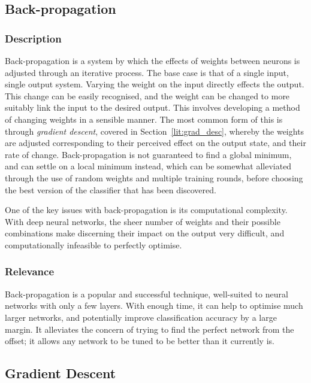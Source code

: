 \subsection{Back-propagation}
\subsubsection{Description}
Back-propagation is a system by which the effects of weights between neurons is adjusted through an iterative process. The base case is that of a single input, single output system. 
Varying the weight on the input directly effects the output. This change can be easily recognised, and the weight can be changed to more suitably link the input to the desired output. This involves developing a method of changing weights in a sensible manner. The most common form of this is through \textit{gradient descent}, covered in Section~\ref{lit:grad_desc}, whereby the weights are adjusted corresponding to their perceived effect on the output state, and their rate of change. Back-propagation is not guaranteed to find a global minimum, and can settle on a local minimum instead, which can be somewhat alleviated through the use of random weights and multiple training rounds, before choosing the best version of the classifier that has been discovered. 


One of the key issues with back-propagation is its computational complexity. With deep neural networks, the sheer number of weights and their possible combinations make discerning their impact on the output very difficult, and computationally infeasible to perfectly optimise.

\subsubsection{Relevance}
Back-propagation is a popular and successful technique, well-suited to neural networks with only a few layers. With enough time, it can help to optimise much larger networks, and potentially improve classification accuracy by a large margin. It alleviates the concern of trying to find the perfect network from the offset; it allows any network to be tuned to be better than it currently is.

\subsection{Gradient Descent}
